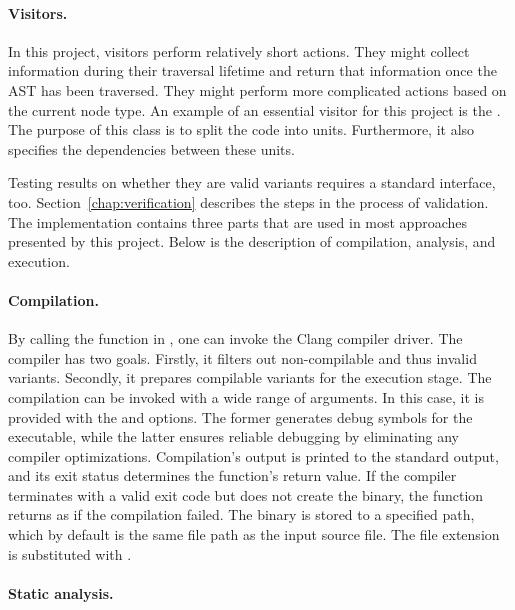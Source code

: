 \paragraph{Visitors.} In this project, visitors perform relatively short 
actions.
They might collect information during their traversal lifetime and return 
that information once the AST has been traversed.
They might perform more complicated  actions based on the 
current node type.
An example of an essential visitor for this project is 
the .
The purpose of this class is to split the code into units.
Furthermore, it also specifies the dependencies between these units.

Testing results on whether they are valid variants requires a standard 
interface, too.
Section~\ref{chap:verification} describes the steps in the process 
of validation.
The implementation contains three parts that are used in most approaches 
presented by this project.
Below is the description of compilation, analysis, and execution.

\paragraph{Compilation.} By calling the  function in 
, one can invoke the Clang compiler driver.
The compiler has two goals.
Firstly, it filters out non-compilable and thus invalid variants.
Secondly, it prepares compilable variants for the execution stage.
The compilation can be invoked with a wide range of arguments.
In this case, it is provided with the  and  options.
The former generates debug symbols for the executable, while the latter 
ensures reliable debugging by eliminating any compiler optimizations.
Compilation's output is printed to the standard output, and its exit status 
determines the function's return value.
If the compiler terminates with a valid exit code but does not create 
the binary, the function returns as if the compilation failed.
The binary is stored to a specified path, which by default is the same file 
path as the input source file.
The file extension is substituted with .

\paragraph{Static analysis.}

